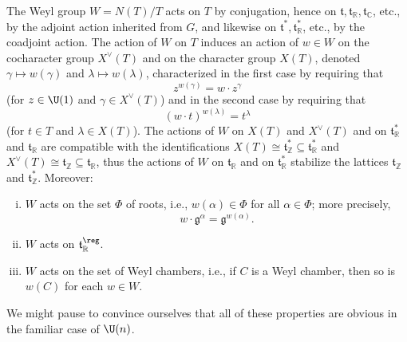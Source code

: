 \documentclass[reqno]{amsart} 
\begin{document}
The Weyl group $W = N(T)/T$ acts on $T$ by conjugation, hence on $\mathfrak{t}, \mathfrak{t}_{\mathbb{R}}, \mathfrak{t}_{\mathbb{C}}$, etc., by the adjoint action inherited from $G$, and likewise on $\mathfrak{t}^*, \mathfrak{t}_{\mathbb{R}}^*$, etc., by the coadjoint action.  The action of $W$ on $T$ induces an action of $w \in W$ on the cocharacter group $X^\vee(T)$ and on the character group $X(T)$, denoted $\gamma \mapsto w(\gamma)$ and $\lambda \mapsto w(\lambda)$, characterized in the first case by requiring that
\begin{equation*}
z^{w (\gamma)} = w \cdot z^{\gamma}
\end{equation*}
(for $z \in \U(1)$ and $\gamma \in X^\vee(T)$) and in the second case by requiring that
\begin{equation*}
  (w \cdot t)^{w(\lambda)} = t^{\lambda}
\end{equation*}
(for $t \in T$ and $\lambda \in X(T)$).  The actions of $W$ on $X(T)$ and $X^\vee(T)$ and on $\mathfrak{t}_{\mathbb{R}}^*$ and $\mathfrak{t}_{\mathbb{R}}$ are compatible with the identifications $X(T) \cong \mathfrak{t}_{\mathbb{Z}}^* \subseteq \mathfrak{t}_{\mathbb{R}}^*$ and $X^\vee(T) \cong \mathfrak{t}_{\mathbb{Z}} \subseteq \mathfrak{t}_{\mathbb{R}}$, thus the actions of $W$ on $\mathfrak{t}_{\mathbb{R}}$ and on $\mathfrak{t}_{\mathbb{R}}^*$ stabilize the lattices $\mathfrak{t}_{\mathbb{Z}}$ and $\mathfrak{t}_{\mathbb{Z}}^*$.  Moreover:
\begin{lemma}\label{sec:weyl-group-acts-on-roots}
  \begin{enumerate}
[(i)]
  \item $W$ acts on the set $\Phi$ of roots, i.e., $w(\alpha) \in \Phi$ for all $\alpha \in \Phi$; more precisely,
    \begin{equation}\label{eq:w-permutes-root-spaces}
      w \cdot \mathfrak{g}^{\alpha}
      =
      \mathfrak{g}^{w(\alpha)}.
    \end{equation}
  \item $W$ acts on $\mathfrak{t}_{\mathbb{R}}^{\reg}$.
  \item $W$ acts on the set of Weyl chambers, i.e., if $C$ is a Weyl chamber, then so is $w(C)$ for each $w \in W$.
  \end{enumerate}
\end{lemma}
We might pause to convince ourselves that all of these properties are obvious in the familiar case of $\U(n)$.
\end{document}
